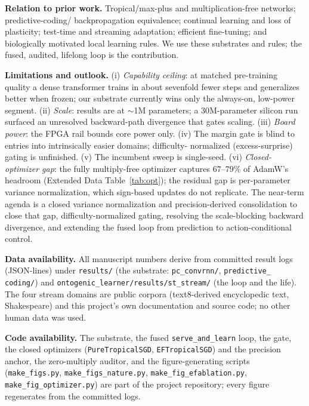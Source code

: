 \documentclass[sn-nature]{sn-jnl}   %
\newcommand{\heading}[1]{\vspace{4pt}\noindent\textbf{#1}\hspace{0.6em}}
\begin{document}
\heading{Relation to prior work.}
Tropical/max-plus and multiplication-free networks\cite{zhang2018tropical,
zhu2024matmulfree,tropicalattention2025,morpmamba2024}; predictive-coding/%
backpropagation equivalence\cite{rao1999predictive,millidge2022predictive,
whittington2017approximation,song2020can}; continual learning and loss of
plasticity\cite{kirkpatrick2017overcoming,dohare2024loss}; test-time and
streaming adaptation\cite{sun2020test,elsayed2024streaming}; efficient
fine-tuning\cite{hu2022lora}; and biologically motivated local learning
rules\cite{lillicrap2016random,fremaux2016neuromodulated,bellec2020solution,
payeur2021burst}. We use these substrates and rules; the fused, audited,
lifelong loop is the contribution.

\heading{Limitations and outlook.}
(i) \emph{Capability ceiling}: at matched pre-training quality a dense
transformer trains in about sevenfold fewer steps and generalizes better when
frozen; our substrate currently wins only the always-on, low-power segment.
(ii) \emph{Scale}: results are at $\sim$1M parameters; a 30M-parameter silicon
run surfaced an unresolved backward-path divergence that gates scaling.
(iii) \emph{Board power}: the FPGA rail bounds core power only. (iv) The margin
gate is blind to entries into intrinsically easier domains; difficulty-%
normalized (excess-surprise) gating is unfinished. (v) The incumbent sweep is
single-seed. (vi) \emph{Closed-optimizer gap}: the fully multiply-free optimizer
captures $67$--$79\%$ of AdamW's headroom (Extended Data Table~\ref{tab:opt}); the
residual gap is per-parameter variance normalization, which sign-based updates do
not replicate. The near-term agenda is a closed variance normalization and
precision-derived consolidation to close that gap, difficulty-normalized gating,
resolving the scale-blocking backward divergence, and extending the fused loop from
prediction to action-conditional control.

\heading{Data availability.}
All manuscript numbers derive from committed result logs (JSON-lines) under
\texttt{results/} (the substrate: \texttt{pc\_convrnn/}, \texttt{predictive\_%
coding/}) and \texttt{ontogenic\_learner/results/st\_stream/} (the loop and the
life). The four stream domains are public corpora (text8-derived encyclopedic
text, Shakespeare) and this project's own documentation and source code; no
other human data was used.

\heading{Code availability.}
The substrate, the fused \texttt{serve\_and\_learn} loop, the gate, the
closed optimizers (\texttt{PureTropicalSGD}, \texttt{EFTropicalSGD}) and the
precision anchor, the zero-multiply auditor, and the figure-generating scripts
(\texttt{make\_figs.py}, \texttt{make\_figs\_nature.py},
\texttt{make\_fig\_efablation.py}, \texttt{make\_fig\_optimizer.py}) are part of
the project repository; every figure regenerates from the committed logs.
\end{document}
